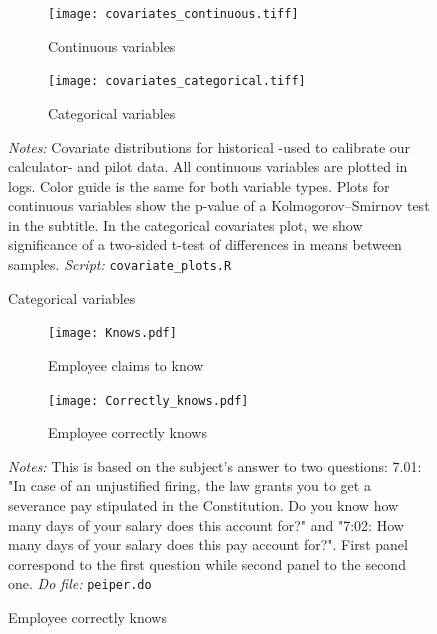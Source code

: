 \documentclass[11pt]{article}
\begin{document}
\begin{figure}[H]
\caption{Covariate distribution in Historical and Pilot data}
\label{covariate_distribution}
    \begin{center}
        \begin{subfigure}{0.49\textwidth}
            \caption{Continuous variables}
            \centering
            \texttt{[image: covariates\_continuous.tiff]}
        \end{subfigure}
        \begin{subfigure}{0.49\textwidth}
            \caption{Categorical variables}
            \centering
            \texttt{[image: covariates\_categorical.tiff]}
        \end{subfigure}
    \end{center}
    {\footnotesize \textit{Notes: } Covariate distributions for historical -used to calibrate our calculator- and pilot data. All continuous variables are plotted in logs. Color guide is the same for both variable types. Plots for continuous variables show the p-value of a Kolmogorov–Smirnov test in the subtitle. In the categorical covariates plot, we show significance of a two-sided t-test of differences in means between samples.}
    {\footnotesize \textit{Script: } \texttt{covariate\_plots.R}}
\end{figure}

\begin{figure}[H]
    \caption{Percent that know main legal constitutional entitlement}
    \label{Knowindemfig}
    \begin{center}
        \begin{subfigure}{0.49\textwidth}
            \caption{Employee claims to know}
            \centering
            \texttt{[image: Knows.pdf]}
        \end{subfigure}
        \begin{subfigure}{0.49\textwidth}
            \caption{Employee correctly knows }
                \centering
                \texttt{[image: Correctly\_knows.pdf]}
        \end{subfigure}
        \end{center}
    {\footnotesize \textit{Notes: } This is based on the subject's answer to two questions: 7.01: "In case of an unjustified firing, the law grants you to get a severance pay stipulated in the Constitution. Do you know how many days of your salary does this account for?" and "7:02: How many days of your salary does this pay account for?". First panel correspond to the first question while second panel to the second one.}
    {\footnotesize \textit{Do file: } \texttt{peiper.do}}
\end{figure}
\end{document}
